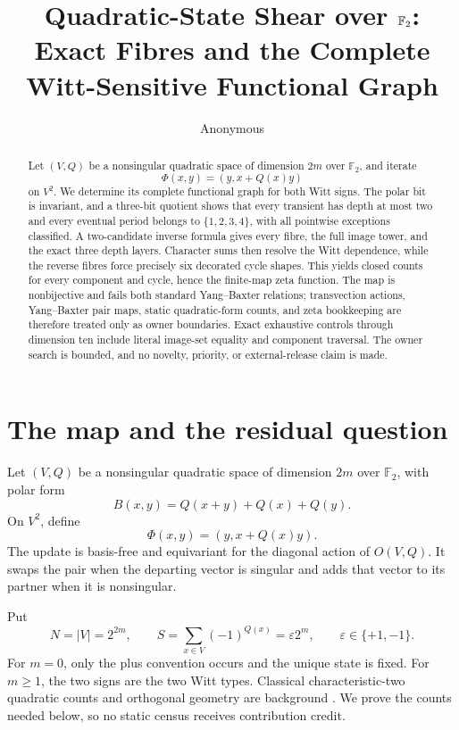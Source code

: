 \documentclass[10pt,a4paper]{amsart}
\title[Quadratic-state shear]{Quadratic-State Shear over \(\F_2\):\\
Exact Fibres and the Complete Witt-Sensitive Functional Graph}
\author{Anonymous}
\date{}
\theoremstyle{definition}
\theoremstyle{remark}
\numberwithin{equation}{section}
\newcommand{\F}{\mathbb F}
\begin{document}
\begin{abstract}
Let \((V,Q)\) be a nonsingular quadratic space of dimension \(2m\) over
\(\F_2\), and iterate
\[
                 \Phi(x,y)=(y,x+Q(x)y)
\]
on \(V^2\).  We determine its complete functional graph for both Witt signs.
The polar bit is invariant, and a three-bit quotient shows that every
transient has depth at most two and every eventual period belongs to
\(\{1,2,3,4\}\), with all pointwise exceptions classified.  A two-candidate
inverse formula gives every fibre, the full image tower, and the exact three
depth layers.  Character sums then resolve the Witt dependence, while the
reverse fibres force precisely six decorated cycle shapes.  This yields
closed counts for every component and cycle, hence the finite-map zeta
function.  The map is nonbijective and fails both standard Yang--Baxter
relations; transvection actions, Yang--Baxter pair maps, static quadratic-form
counts, and zeta bookkeeping are therefore treated only as owner boundaries.
Exact exhaustive controls through dimension ten include literal image-set
equality and component traversal.  The owner search is bounded, and no
novelty, priority, or external-release claim is made.
\end{abstract}

\maketitle

\section{The map and the residual question}

Let \((V,Q)\) be a nonsingular quadratic space of dimension \(2m\) over
\(\F_2\), with polar form
\[
 B(x,y)=Q(x+y)+Q(x)+Q(y).
\]
On \(V^2\), define
\begin{equation}
                  \Phi(x,y)=(y,x+Q(x)y).                 \label{eq:map}
\end{equation}
The update is basis-free and equivariant for the diagonal action of
\(O(V,Q)\).  It swaps the pair when the departing vector is singular and
adds that vector to its partner when it is nonsingular.

Put
\begin{equation}
 N=|V|=2^{2m},\qquad
 S=\sum_{x\in V}(-1)^{Q(x)}=\varepsilon2^m,\qquad
 \varepsilon\in\{+1,-1\}.                               \label{eq:NS}
\end{equation}
For \(m=0\), only the plus convention occurs and the unique state is fixed.
For \(m\ge1\), the two signs are the two Witt types.  Classical
characteristic-two quadratic counts and orthogonal geometry are background
\cite{Fulton1977,HallShpectorov2021}.  We prove the counts needed below, so
no static census receives contribution credit.
\end{document}
